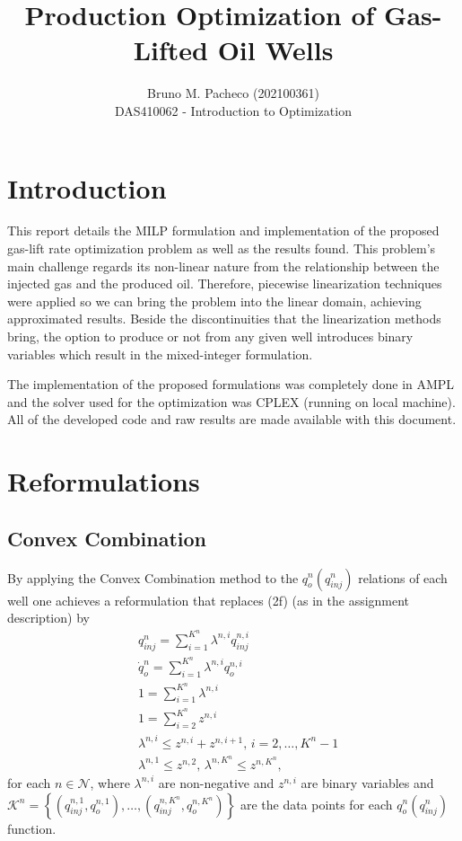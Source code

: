 \documentclass[a4paper]{report}
\begin{document}
 
\title{Production Optimization of Gas-Lifted Oil Wells}
\author{Bruno M. Pacheco (202100361) \\
DAS410062 - Introduction to Optimization}
 
\maketitle
 
\section{Introduction}

This report details the MILP formulation and implementation of the proposed gas-lift rate optimization problem as well as the results found. This problem's main challenge regards its non-linear nature from the relationship between the injected gas and the produced oil. Therefore, piecewise linearization techniques were applied so we can bring the problem into the linear domain, achieving approximated results. Beside the discontinuities that the linearization methods bring, the option to produce or not from any given well introduces binary variables which result in the mixed-integer formulation.

The implementation of the proposed formulations was completely done in AMPL and the solver used for the optimization was CPLEX (running on local machine). All of the developed code and raw results are made available with this document.

\section{Reformulations}

\subsection{Convex Combination}

By applying the Convex Combination method to the $q_o^{n}\left( q_{inj}^n \right) $ relations of each well one achieves a reformulation that replaces (2f) (as in the assignment description) by
\begin{align*}
    &q_{inj}^{n} = \sum_{i=1}^{K^{n}} \lambda^{n,i} q_{inj}^{n,i} \\
    &\dot{q}_o^{n} = \sum_{i=1}^{K^{n}} \lambda^{n,i} q_o^{n,i} \\
    &1 = \sum_{i=1}^{K^{n}} \lambda^{n,i} \tag{$*$}\\
    &1 = \sum_{i=2}^{K^{n}} z^{n,i} \\
    &\lambda^{n,i} \le z^{n,i} + z^{n,i+1},\, i=2,\ldots,K^{n}-1 \\
    &\lambda^{n,1} \le z^{n,2},\, \lambda^{n,K^{n}} \le z^{n,K^{n}}
,\end{align*}
for each $n \in \mathcal{N}$, where $\lambda^{n,i}$ are non-negative and $z^{n,i}$ are binary variables and $\mathcal{K}^{n} = \left\{  \left( q_{inj}^{n,1}, q_o^{n,1} \right), \ldots, \left( q_{inj}^{n,K^{n}}, q_o^{n,K^{n}} \right) \right\} $ are the data points for each $q_o^{n}\left( q_{inj}^n \right)$ function.
\end{document}
